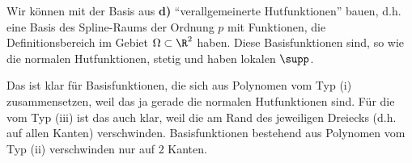 \begin{solution}
\begin{enumerate}[label = \textbf{\alph*)}]
  \begin{comment}

  Ganz Allgemein:

  Sei $B$ eine Polynombasis von $P_p$, und $n := \dim P_p = |B|$.
  Seien $(x_1, y_1), \dots, (x_n, y_n) \in \K^2$ paarweise verschiedene Interpolations-Knoten und $p(x_1, y_1), \dots, p(x_n, y_n) \in \K$ Interpolations-Werte.
  Durch ein lineares Gleichungssystem mit Vandermonde-Matrix bzgl. $B$ und $(x_1, y_1), \dots, (x_n, y_n)$ als linke Seite und $(p(x_1, y_1), \dots, p(x_n, y_n))^T$ als rechte Seite, können wir die Koeffizienten eines eindeutigen Polynoms $p \in P_p$ finden, dass an den Interpolations-Knoten die gewünschten Interpolations-Werte annimmt. \\

  In unserem Fall:

  Wenn wir in Proposition 3.1 von Ordnung $p$ nach $p + 1$ gehen, dann müssen wir $p + 1$ Interpolations-Knoten (aus dem Dreieck) und -Werte hinzufügen.

  Wir wollen, dass unser (durch die lokale Interpolation auf den Dreiecken zusammengesetzter) Spline stetig ist.
  Außerhalb der Kanten ist das immer der Fall.
  Auf den Kanten müssten die angrenzenden Interpolations-Polynome übereinstimmen.

  Das erzielen wir, indem wir beim Ordnungs-Übergang zu jeder Kante genau einen Interpolations-Knoten hinzufügen.
  (Den Rest packen wir ins Innere der Dreiecke.)
  Für jede Kante sind die darauf eingeschränkten Interpolations-Polynome eindeutig bestimmt.
  Insbesondere stimmen angrenzende Polynome darauf überein.

  \end{comment}

  Wir können mit der Basis aus \textbf{d)} \enquote{verallgemeinerte Hutfunktionen} bauen, d.h. eine Basis des Spline-Raums der Ordnung $p$ mit Funktionen, die Definitionsbereich im Gebiet $\Omega \subset \R^2$ haben.
  Diese Basisfunktionen sind, so wie die normalen Hutfunktionen, stetig und haben lokalen $\supp$.

  Das ist klar für Basisfunktionen, die sich aus Polynomen vom Typ (i) zusammensetzen, weil das ja gerade die normalen Hutfunktionen sind.
  Für die vom Typ (iii) ist das auch klar, weil die am Rand des jeweiligen Dreiecks (d.h. auf allen Kanten) verschwinden.
  Basisfunktionen bestehend aus Polynomen vom Typ (ii) verschwinden nur auf $2$ Kanten.


\end{enumerate}
\end{solution}
